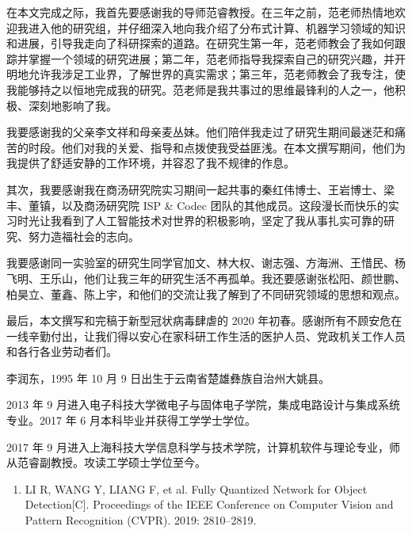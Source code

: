 \documentclass[
  fontset = source,
]{shtthesis}
\begin{document}
\backmatter
\begin{acknowledgement}
在本文完成之际，我首先要感谢我的导师范睿教授。在三年之前，范老师热情地欢迎我进入他的研究组，并仔细深入地向我介绍了分布式计算、机器学习领域的知识和进展，引导我走向了科研探索的道路。在研究生第一年，范老师教会了我如何跟踪并掌握一个领域的研究进展；第二年，范老师指导我探索自己的研究兴趣，并开明地允许我涉足工业界，了解世界的真实需求；第三年，范老师教会了我专注，使我能够持之以恒地完成我的研究。范老师是我共事过的思维最锋利的人之一，他积极、深刻地影响了我。

我要感谢我的父亲李文祥和母亲麦丛妹。他们陪伴我走过了研究生期间最迷茫和痛苦的时段。他们对我的关爱、指导和点拨使我受益匪浅。在本文撰写期间，他们为我提供了舒适安静的工作环境，并容忍了我不规律的作息。

其次，我要感谢我在商汤研究院实习期间一起共事的秦红伟博士、王岩博士、梁丰、董镇，以及商汤研究院 ISP \& Codec 团队的其他成员。这段漫长而快乐的实习时光让我看到了人工智能技术对世界的积极影响，坚定了我从事扎实可靠的研究、努力造福社会的志向。

我要感谢同一实验室的研究生同学官加文、林大权、谢志强、方海洲、王惜民、杨飞明、王乐山，他们让我三年的研究生活不再孤单。我还要感谢张松阳、颜世鹏、柏昊立、董鑫、陈上宇，和他们的交流让我了解到了不同研究领域的思想和观点。

最后，本文撰写和完稿于新型冠状病毒肆虐的 2020 年初春。感谢所有不顾安危在一线辛勤付出，让我们得以安心在家科研工作生活的医护人员、党政机关工作人员和各行各业劳动者们。
\end{acknowledgement}

\begin{resume}
李润东，1995 年 10 月 9 日出生于云南省楚雄彝族自治州大姚县。

2013 年 9 月进入电子科技大学微电子与固体电子学院，集成电路设计与集成系统专业。2017 年 6 月本科毕业并获得工学学士学位。

2017 年 9 月进入上海科技大学信息科学与技术学院，计算机软件与理论专业，师从范睿副教授。攻读工学硕士学位至今。
\end{resume}

\begin{publications}
\begin{enumerate}
  \item LI R, WANG Y, LIANG F, et al. Fully Quantized Network for Object Detection[C]. Proceedings of the IEEE Conference on Computer Vision and Pattern Recognition (CVPR). 2019: 2810--2819.
\end{enumerate}
\end{publications}
\end{document}
